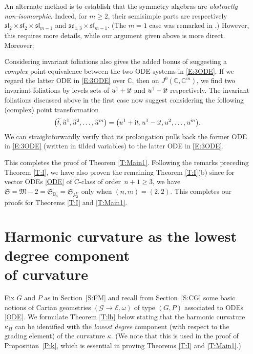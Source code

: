\documentclass[pdftex]{sigma}%
\DeclareMathOperator{\tf}{tf}
\newcommand\cG{\mathcal{G}}
\newcommand\fM{\mathfrak{M}}
\newcommand\fS{\mathfrak{S}}
\newcommand\fsl{\mathfrak{sl}}
\newcommand{\C}{\mathbb{C}}
\newcommand\bbA{\mathbb{A}}
\newcommand\bbB{\mathbb{B}}
\newcommand\cE{\mathcal{E}}
\numberwithin{equation}{section}
\begin{document}
 An alternate method is to establish that the symmetry algebras are {\em abstractly non-isomorphic}. Indeed, for $m \geq 2$, their semisimple parts are respectively $\fsl_2 \times \fsl_2 \times \fsl_{m-1}$ and $\mathfrak{so}_{1,3} \times \fsl_{m-1}$. (The $m=1$ case was remarked in \cite[p.~18]{AMS2021}.) However, this requires more details, while our argument given above is more direct. Moreover:

 \begin{Remark} Considering invariant foliations also gives the added bonus of suggesting a {\em complex} point-equivalence between the two ODE systems in \eqref{E:3ODE}. If we regard the latter ODE in \eqref{E:3ODE} over $\C$, then on $J^0(\C,\C^m)$, we find two invariant foliations by levels sets of $u^1 + {\rm i} t$ and $u^1 - {\rm i} t$ respectively. The invariant foliations discussed above in the first case now suggest considering the following (complex) point transformation
 \begin{align*}
 \bigl(\widetilde{t}, \widetilde{u}^1, \widetilde{u}^2,\dots , \widetilde{u}^m\bigr) = \bigl(u^1 + {\rm i} t, u^1 - {\rm i} t, u^2,\dots , u^m\bigr).
 \end{align*}
 We can straightforwardly verify that its prolongation pulls back the former ODE in \eqref{E:3ODE} (written in tilded variables) to the latter ODE in \eqref{E:3ODE}.
\end{Remark}

This completes the proof of Theorem \ref{T:Main1}. Following the remarks preceding Theorem \ref{T:I}, we have also proven the remaining Theorem \ref{T:I}(b) since for vector ODEs \eqref{ODE} of C-class of order~$n+1 \ge 3$, we have $\fS = \fM-2 = \fS_{\bbB_4} = \fS_{\bbA_2^{\tf}}$ only when $(n,m)= (2,2)$. This completes our proofs for Theorems \ref{T:I} and \ref{T:Main1}.

\appendix

\section[Harmonic curvature as the lowest degree component of curvature]{Harmonic curvature as the lowest degree component\\ of curvature} \label{S:kappa}

Fix $G$ and $P$ as in Section~\ref{S:FM} and recall from Section~\ref{S:CG} some basic notions of Cartan geometries $(\cG \to \cE, \omega)$ of type $(G, P)$ associated to ODEs \eqref{ODE}. We formulate Theorem \ref{T:lh} below stating that the harmonic curvature $\kappa_H$ can be identified with the {\em lowest degree} component (with respect to the grading element) of the curvature $\kappa$. (We note that this is used in the proof of Proposition~\ref{P:k}, which is essential in proving Theorems \ref{T:I} and \ref{T:Main1}.)
\end{document}
